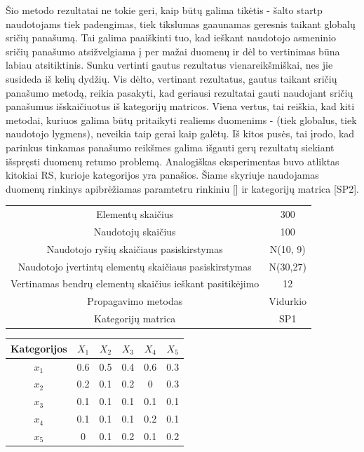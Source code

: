 \documentclass{VUMIFInfMagistrinis}
\begin{document}
\indent
Šio metodo rezultatai ne tokie geri, kaip būtų galima tikėtis - šalto startp naudotojams tiek padengimas, tiek tikslumas gaaunamas geresnis taikant globalų sričių panašumą. Tai galima paaiškinti tuo, kad ieškant naudotojo asmeninio sričių panašumo atsižvelgiama į per mažai duomenų ir dėl to vertinimas būna labiau atsitiktinis. 
\newline
\indent 
Sunku vertinti gautus rezultatus vienareikšmiškai, nes jie susideda iš kelių dydžių. Vis dėlto, vertinant rezultatus, gautus taikant sričių panašumo metodą, reikia pasakyti, kad geriausi rezultatai gauti naudojant sričių panašumus išskaičiuotus iš kategorijų matricos. Viena vertus, tai reiškia, kad kiti metodai, kuriuos galima būtų pritaikyti realiems duomenims - (tiek globalus, tiek naudotojo lygmens), neveikia taip gerai kaip galėtų. Iš kitos pusės, tai įrodo, kad parinkus tinkamas panašumo reikšmes galima išgauti gerų rezultatų siekiant išspręsti duomenų retumo problemą.
\indent 
Analogiškas eksperimentas buvo atliktas kitokiai RS, kurioje kategorijos yra panašios. Šiame skyriuje naudojamas duomenų rinkinys apibrėžiamas paramtetru rinkiniu [] ir kategorijų matrica [SP2].
\begin{center}
	\begin{tabular}{||c c||} 
		
		
		Elementų skaičius & 300 \\
		Naudotojų skaičius & 100 \\
		Naudotojo ryšių skaičiaus pasiskirstymas &  N(10, 9) \\
		Naudotojo įvertintų elementų skaičiaus pasiskirstymas & N(30,27) \\
		Vertinamas bendrų elementų skaičius ieškant pasitikėjimo & 12 \\
		Propagavimo metodas & Vidurkio\\
		Kategorijų matrica & SP1 \\
	\end{tabular}
	
\end{center}
\begin{center}
	\begin{tabular}{||c c c c c c||} 
		\hline
		Kategorijos & $X_1$ & $X_2$ & $X_3$ & $X_4$ & $X_5$ \\ [0.5ex] 
		\hline\hline
		$x_1$ & 0.6 & 0.5 & 0.4 & 0.6 & 0.3 \\ 
		\hline
		$x_2$ & 0.2 & 0.1 & 0.2 & 0 & 0.3 \\
		\hline
		$x_3$ & 0.1 & 0.1 & 0.1 & 0.1 & 0.1 \\
		\hline
		$x_4$ & 0.1 & 0.1 & 0.1 & 0.2 & 0.1 \\
		\hline
		$x_5$ & 0 & 0.1 & 0.2 & 0.1 & 0.2 \\ [1ex] 
		\hline
	\end{tabular}\label{DS2}
\end{center}
\end{document}
